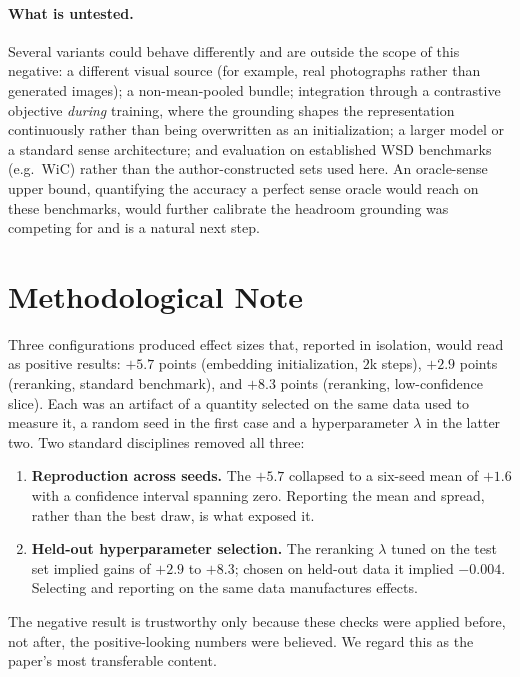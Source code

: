 \documentclass[twoside,11pt]{article}
\begin{document}
\paragraph{What is untested.}
Several variants could behave differently and are outside the scope of this negative: a different visual source (for example, real photographs rather than generated images); a non-mean-pooled bundle; integration through a contrastive objective \emph{during} training, where the grounding shapes the representation continuously rather than being overwritten as an initialization; a larger model or a standard sense architecture; and evaluation on established WSD benchmarks (e.g.\ WiC) rather than the author-constructed sets used here. An oracle-sense upper bound, quantifying the accuracy a perfect sense oracle would reach on these benchmarks, would further calibrate the headroom grounding was competing for and is a natural next step.

\section{Methodological Note}
\label{sec:method}

Three configurations produced effect sizes that, reported in isolation, would read as positive results: $+5.7$ points (embedding initialization, $2$k steps), $+2.9$ points (reranking, standard benchmark), and $+8.3$ points (reranking, low-confidence slice). Each was an artifact of a quantity selected on the same data used to measure it, a random seed in the first case and a hyperparameter $\lambda$ in the latter two. Two standard disciplines removed all three:
\begin{enumerate}
\item \textbf{Reproduction across seeds.} The $+5.7$ collapsed to a six-seed mean of $+1.6$ with a confidence interval spanning zero. Reporting the mean and spread, rather than the best draw, is what exposed it.
\item \textbf{Held-out hyperparameter selection.} The reranking $\lambda$ tuned on the test set implied gains of $+2.9$ to $+8.3$; chosen on held-out data it implied $-0.004$. Selecting and reporting on the same data manufactures effects.
\end{enumerate}
The negative result is trustworthy only because these checks were applied before, not after, the positive-looking numbers were believed. We regard this as the paper's most transferable content.
\end{document}

